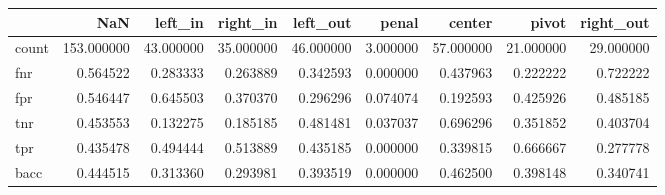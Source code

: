 \begin{tabular}{lrrrrrrrr}
\toprule
{} &         NaN &    left\_in &   right\_in &   left\_out &     penal &     center &      pivot &  right\_out \\
\midrule
count &  153.000000 &  43.000000 &  35.000000 &  46.000000 &  3.000000 &  57.000000 &  21.000000 &  29.000000 \\
fnr   &    0.564522 &   0.283333 &   0.263889 &   0.342593 &  0.000000 &   0.437963 &   0.222222 &   0.722222 \\
fpr   &    0.546447 &   0.645503 &   0.370370 &   0.296296 &  0.074074 &   0.192593 &   0.425926 &   0.485185 \\
tnr   &    0.453553 &   0.132275 &   0.185185 &   0.481481 &  0.037037 &   0.696296 &   0.351852 &   0.403704 \\
tpr   &    0.435478 &   0.494444 &   0.513889 &   0.435185 &  0.000000 &   0.339815 &   0.666667 &   0.277778 \\
bacc  &    0.444515 &   0.313360 &   0.293981 &   0.393519 &  0.000000 &   0.462500 &   0.398148 &   0.340741 \\
\bottomrule
\end{tabular}
